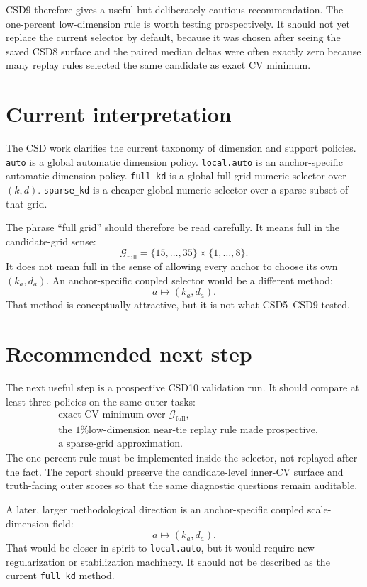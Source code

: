 \documentclass[11pt]{article}
\newcommand{\Gfull}{\mathcal G_{\mathrm{full}}}
\newcommand{\code}[1]{\texttt{#1}}
\begin{document}
CSD9 therefore gives a useful but deliberately cautious recommendation.  The
one-percent low-dimension rule is worth testing prospectively.  It should not yet
replace the current selector by default, because it was chosen after seeing the
saved CSD8 surface and the paired median deltas were often exactly zero because
many replay rules selected the same candidate as exact CV minimum.

\section{Current interpretation}

The CSD work clarifies the current taxonomy of dimension and support policies.
\code{auto} is a global automatic dimension policy.  \code{local.auto} is an
anchor-specific automatic dimension policy.  \code{full\_kd} is a global
full-grid numeric selector over $(k,d)$.  \code{sparse\_kd} is a cheaper global
numeric selector over a sparse subset of that grid.

The phrase ``full grid'' should therefore be read carefully.  It means full in
the candidate-grid sense:
\[
  \Gfull=\{15,\ldots,35\}\times\{1,\ldots,8\}.
\]
It does not mean full in the sense of allowing every anchor to choose its own
$(k_a,d_a)$.  An anchor-specific coupled selector would be a different method:
\[
  a\mapsto (k_a,d_a).
\]
That method is conceptually attractive, but it is not what CSD5--CSD9 tested.

\section{Recommended next step}

The next useful step is a prospective CSD10 validation run.  It should compare
at least three policies on the same outer tasks:
\begin{align*}
  &\text{exact CV minimum over }\Gfull,\\
  &\text{the 1\% low-dimension near-tie replay rule made prospective},\\
  &\text{a sparse-grid approximation}.
\end{align*}
The one-percent rule must be implemented inside the selector, not replayed after
the fact.  The report should preserve the candidate-level inner-CV surface and
truth-facing outer scores so that the same diagnostic questions remain auditable.

A later, larger methodological direction is an anchor-specific coupled
scale-dimension field:
\[
  a\mapsto (k_a,d_a).
\]
That would be closer in spirit to \code{local.auto}, but it would require new
regularization or stabilization machinery.  It should not be described as the
current \code{full\_kd} method.
\end{document}
